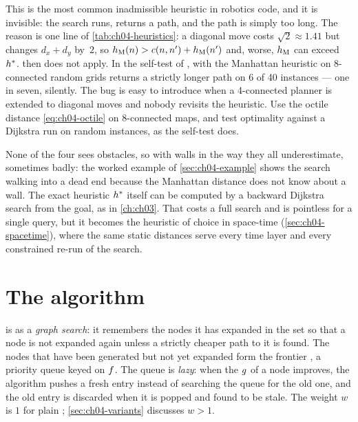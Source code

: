 \begin{pitfall}
This is the most common inadmissible heuristic in robotics code, and it is
invisible: the search runs, returns a path, and the path is simply too long.
The reason is one line of \cref{tab:ch04-heuristics}: a diagonal move costs
$\sqrt{2} \approx 1.41$ but changes $d_x + d_y$ by~$2$, so
$h_{\mathrm{M}}(n) > c(n,n') + h_{\mathrm{M}}(n')$ and, worse,
$h_{\mathrm{M}}$ can exceed $h^*$.  then does
not apply. In the self-test of , \astar with the Manhattan
heuristic on 8-connected random grids returns a strictly longer path on 6 of 40
instances --- one in seven, silently. The bug is easy to introduce when a
4-connected planner is extended to diagonal moves and nobody revisits the
heuristic. Use the octile distance \cref{eq:ch04-octile} on 8-connected maps,
and test optimality against a Dijkstra run on random instances, as the self-test
does.
\end{pitfall}

None of the four sees obstacles, so with walls in the way they all
underestimate, sometimes badly: the worked example of \cref{sec:ch04-example}
shows the search walking into a dead end because the Manhattan distance does
not know about a wall. The exact heuristic $h^*$ itself can be computed by a
backward Dijkstra search from the goal, as in \cref{ch:ch03}. That costs a full
search and is pointless for a single query, but it becomes the heuristic of
choice in space-time (\cref{sec:ch04-spacetime}), where the same static
distances serve every time layer and every constrained re-run of the search.

\section{The algorithm}
\label{sec:ch04-algorithm}

 is \astar as a \emph{graph search}: it remembers the nodes
it has expanded in the set \Closed{} so that a node is not
expanded again unless a strictly cheaper path to it is found. The nodes that
have been generated but not yet expanded form the frontier \Open, a priority
queue keyed on $f$. The queue is \emph{lazy}: when the
$g$ of a node improves, the algorithm pushes a fresh entry instead of
searching the queue for the old one, and the old entry is discarded when it is
popped and found to be stale. The weight $w$
is $1$ for plain \astar; \cref{sec:ch04-variants} discusses $w > 1$.

